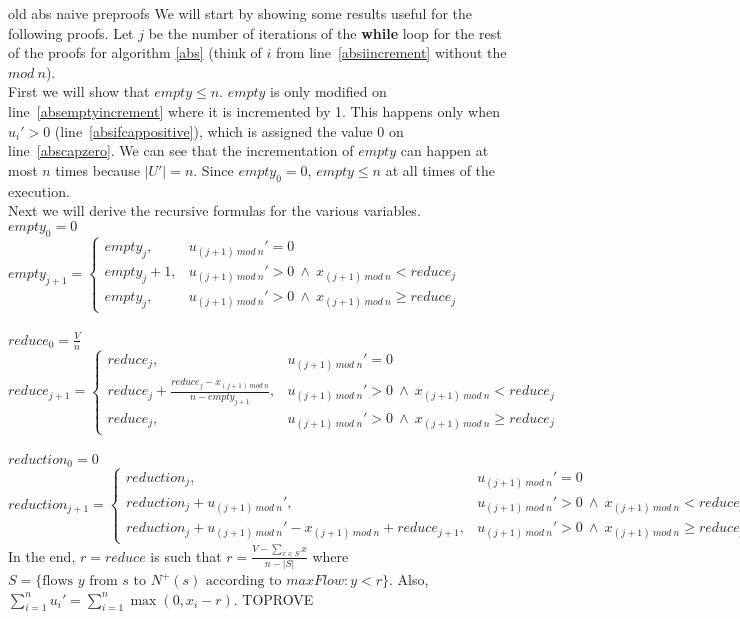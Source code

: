 old abs naive preproofs
  We will start by showing some results useful for the following proofs. Let $j$ be the number of iterations of the
  \textbf{while} loop for the rest of the proofs for algorithm \ref{abs} (think of $i$ from line~\ref{absiincrement}
  without the $mod\:n$).\\
  First we will show that $empty \leq n$. $empty$ is only modified on line~\ref{absemptyincrement} where it is
  incremented by 1. This happens only when $u_i' > 0$ (line~\ref{absifcappositive}), which is assigned the value 0 on
  line~\ref{abscapzero}. We can see that the incrementation of $empty$ can happen at most $n$ times because
  $|U'| = n$. Since $empty_0 = 0$, $empty \leq n$ at all times of the execution. \\
  Next we will derive the recursive formulas for the various variables. \\
  $empty_0 = 0$ \\
  $empty_{j+1} = 
     \begin{cases}
        empty_j, & u_{(j+1)\:mod\:n}' = 0 \\
        empty_j+1, & u_{(j+1)\:mod\:n}' > 0 \: \wedge \: x_{(j+1) \:mod\:n} < reduce_j \\
        empty_j, & u_{(j+1)\:mod\:n}' > 0 \: \wedge \: x_{(j+1) \:mod\:n} \geq reduce_j
     \end{cases}$ \\ \ \\
  $reduce_0 = \frac{V}{n}$ \\
  $reduce_{j+1} =
     \begin{cases}
        reduce_j, & u_{(j+1)\:mod\:n}' = 0 \\
        reduce_j + \frac{reduce_j-x_{(j+1)\:mod\:n}}{n-empty_{j+1}}, & u_{(j+1)\:mod\:n}' > 0 \: \wedge \:
           x_{(j+1) \:mod\:n} < reduce_j \\
        reduce_j, & u_{(j+1)\:mod\:n}' > 0 \: \wedge \: x_{(j+1) \:mod\:n} \geq reduce_j
     \end{cases}$ \\ \ \\
  $reduction_0 = 0$ \\
  $reduction_{j+1} =
     \begin{cases}
        reduction_j, & u_{(j+1)\:mod\:n}' = 0 \\
        reduction_j + u_{(j+1)\:mod\:n}', & u_{(j+1)\:mod\:n}' > 0 \: \wedge \: x_{(j+1) \:mod\:n} < reduce_j \\
        reduction_j + u_{(j+1)\:mod\:n}' - x_{(j+1)\:mod\:n} + reduce_{j+1}, &
           u_{(j+1)\:mod\:n}' > 0 \: \wedge \: x_{(j+1) \:mod\:n} \geq reduce_j
     \end{cases}$ \\
  In the end, $r = reduce$ is such that $r = \frac{V - \sum\limits_{x \in S}x}{n - |S|}$ where
  $S = \{\text{flows } y \text{ from } s \text{ to } N^{+}(s) \text{ according to } maxFlow : y < r\}$. Also,
  $\sum\limits_{i=1}^{n}u_i' = \sum\limits_{i=1}^{n}\max{(0,x_i - r)}$. TOPROVE

